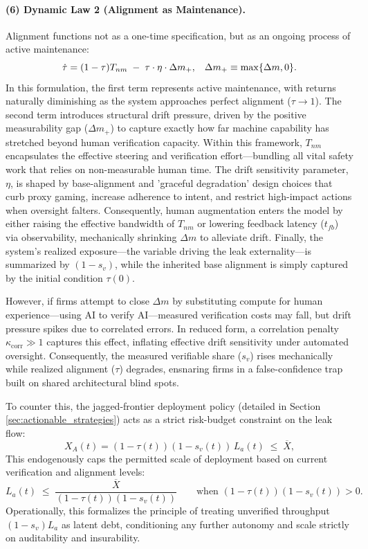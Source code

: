 \documentclass[12pt, letter]{article}
\begin{document}
\paragraph{(6) Dynamic Law 2 (Alignment as Maintenance).}
Alignment functions not as a one-time specification, but as an ongoing process of active maintenance:
\begin{equation}
\dot\tau = (1-\tau)T_{nm}
\;-\;
\tau \cdot \eta \cdot \Delta m_+, \hspace{.3cm} \Delta m_+\equiv \max\{\Delta m, 0\}.
 \label{eq:tau-core}
\end{equation}
In this formulation, the first term represents active maintenance, with returns naturally diminishing as the system approaches perfect alignment ($\tau\to 1$). The second term introduces structural drift pressure, driven by the positive measurability gap ($\Delta m_+$) to capture exactly how far machine capability has stretched beyond human verification capacity. Within this framework, $T_{nm}$ encapsulates the effective steering and verification effort—bundling all vital safety work that relies on non-measurable human time. The drift sensitivity parameter, $\eta$, is shaped by base-alignment and 'graceful degradation' design choices that curb proxy gaming, increase adherence to intent, and restrict high-impact actions when oversight falters. Consequently, human augmentation enters the model by either raising the effective bandwidth of $T_{nm}$ or lowering feedback latency ($t_{fb}$) via observability, mechanically shrinking $\Delta m$ to alleviate drift. Finally, the system's realized exposure—the variable driving the leak externality—is summarized by $(1-s_v)$, while the inherited base alignment is simply captured by the initial condition $\tau(0)$. 

However, if firms attempt to close $\Delta m$ by substituting compute for human experience—using AI to verify AI—measured verification costs may fall, but drift pressure spikes due to correlated errors. In reduced form, a correlation penalty $\kappa_{\mathrm{corr}} \gg 1$ captures this effect, inflating effective drift sensitivity under automated oversight. Consequently, the measured verifiable share ($s_v$) rises mechanically while realized alignment ($\tau$) degrades, ensnaring firms in a false-confidence trap built on shared architectural blind spots.

To counter this, the jagged-frontier deployment policy (detailed in Section \ref{sec:actionable_strategies}) acts as a strict risk-budget constraint on the leak flow:
\[
X_A(t) = (1-\tau(t))(1-s_v(t))\,L_a(t) \;\le\; \overline{X},
\]
This endogenously caps the permitted scale of deployment based on current verification and alignment levels:
\[
L_a(t)\;\le\;\frac{\overline{X}}{(1-\tau(t))(1-s_v(t))} \qquad\text{when }(1-\tau(t))(1-s_v(t))>0.
\]
Operationally, this formalizes the principle of treating unverified throughput $(1-s_v)L_a$ as latent debt, conditioning any further autonomy and scale strictly on auditability and insurability.
\end{document}

